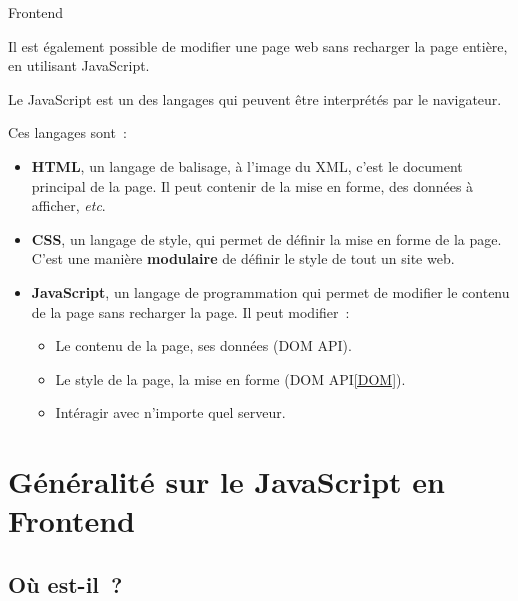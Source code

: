 \documentclass{beamer}
\begin{document}
    \begin{frame}{Frontend}
        \begin{small}
            Il est également possible de modifier une page web sans recharger la page entière, en utilisant JavaScript.

            Le JavaScript est un des langages qui peuvent être interprétés par le navigateur.

            Ces langages sont~:
            \begin{itemize}
                \item \textbf{HTML}, un langage de balisage, à l'image du XML, c'est le document principal de la page.
                Il peut contenir de la mise en forme, des données à afficher, \textit{etc}.
                \item \textbf{CSS}, un langage de style, qui permet de définir la mise en forme de la page.
                C'est une manière \textbf{modulaire} de définir le style de tout un site web.
                \item \textbf{JavaScript}, un langage de programmation qui permet de modifier le contenu de la page sans recharger la page.
                Il peut modifier~:
                \begin{itemize}
                    \item Le contenu de la page, ses données (DOM API\footnotemark{}).
                    \item Le style de la page, la mise en forme (DOM API\cref{DOM}).
                    \item Intéragir avec n'importe quel serveur.
                \end{itemize}
            \end{itemize}
        \end{small}
    \end{frame}


    \section{Généralité sur le JavaScript en Frontend}\label{sec:js-basic}

    \subsection{Où est-il~?}\label{sec:where}
\end{document}
